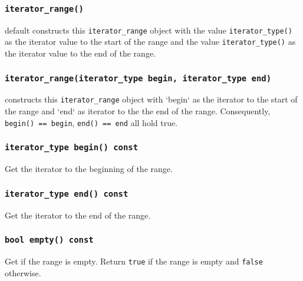 \documentclass[oneside]{article}
\begin{document}
\subsubsection{\texttt{iterator\_range()}}
default
constructs this \texttt{iterator\_range} object with
the value \texttt{iterator\_type()} as the iterator value to the start of the range and
the value \texttt{iterator\_type()} as the iterator value to the end of the range.

\subsubsection{\texttt{iterator\_range(iterator\_type begin, iterator\_type end)}}
constructs this \texttt{iterator\_range} object with
`begin` as the iterator to the start of the range and
`end` as iterator to the the end of the range.
Consequently, \texttt{begin() == begin}, \texttt{end() == end} all hold true.

\subsubsection{\texttt{iterator\_type begin() const}}
Get the iterator to the beginning of the range.

\subsubsection{\texttt{iterator\_type end() const}}
Get the iterator to the end of the range.

\subsubsection{\texttt{bool empty() const}}
Get if the range is empty.
Return \verb+true+ if the range is empty and \verb+false+ otherwise.
\end{document}
